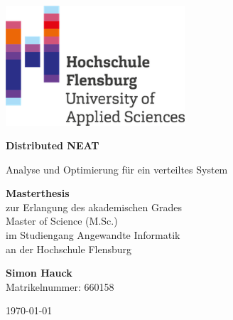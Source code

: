 \documentclass[12pt,a4paper]{article}
\begin{document}
	
\begin{titlepage}
	\begin{center}
		\includegraphics[width=0.50\textwidth]{img/hs_logo.png}\par\vspace{0cm}
		\vspace{1.5cm}
		{\huge\bfseries Distributed NEAT \par}
		\vspace{0.5cm}
		{\LARGE Analyse und Optimierung für ein verteiltes System\par}
		\vspace{2cm}
	\end{center}

	\begin{large}
		\noindent
		\textbf{Masterthesis}\\
		zur Erlangung des akademischen Grades\\
		Master of Science (M.Sc.)\\
		im Studiengang Angewandte Informatik\\
		an der Hochschule Flensburg
		\vspace{1cm}
	\end{large}
	
	\begin{large}
		\noindent
		\textbf{Simon Hauck}\\
		Matrikelnummer: 660158
	\end{large}

	
	\vfill

	{\large \centering \today\par}
\end{titlepage}


\tableofcontents


\printbibliography[
heading=bibintoc, 
title={Quellenverzeichnis}
]
\end{document}

